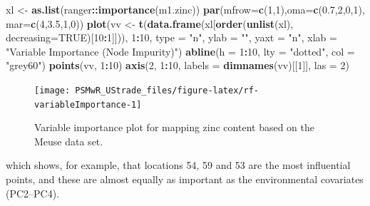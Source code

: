 \documentclass[graybox,natbib,nospthms,UStrade]{svmono}
\newenvironment{Shaded}{\begin{snugshade}}{\end{snugshade}}
\newcommand{\DataTypeTok}[1]{\textcolor[rgb]{0.27,0.27,0.27}{#1}}
\newcommand{\DecValTok}[1]{\textcolor[rgb]{0.06,0.06,0.06}{#1}}
\newcommand{\FloatTok}[1]{\textcolor[rgb]{0.06,0.06,0.06}{#1}}
\newcommand{\KeywordTok}[1]{\textcolor[rgb]{0.27,0.27,0.27}{\textbf{#1}}}
\newcommand{\NormalTok}[1]{#1}
\newcommand{\OperatorTok}[1]{\textcolor[rgb]{0.43,0.43,0.43}{\textbf{#1}}}
\newcommand{\OtherTok}[1]{\textcolor[rgb]{0.37,0.37,0.37}{#1}}
\newcommand{\StringTok}[1]{\textcolor[rgb]{0.5,0.5,0.5}{#1}}
\begin{document}
\begin{Shaded}
\begin{Highlighting}[]
\NormalTok{xl <-}\StringTok{ }\KeywordTok{as.list}\NormalTok{(ranger}\OperatorTok{::}\KeywordTok{importance}\NormalTok{(m1.zinc))}
\KeywordTok{par}\NormalTok{(}\DataTypeTok{mfrow=}\KeywordTok{c}\NormalTok{(}\DecValTok{1}\NormalTok{,}\DecValTok{1}\NormalTok{),}\DataTypeTok{oma=}\KeywordTok{c}\NormalTok{(}\FloatTok{0.7}\NormalTok{,}\DecValTok{2}\NormalTok{,}\DecValTok{0}\NormalTok{,}\DecValTok{1}\NormalTok{), }\DataTypeTok{mar=}\KeywordTok{c}\NormalTok{(}\DecValTok{4}\NormalTok{,}\FloatTok{3.5}\NormalTok{,}\DecValTok{1}\NormalTok{,}\DecValTok{0}\NormalTok{))}
\KeywordTok{plot}\NormalTok{(vv <-}\StringTok{ }\KeywordTok{t}\NormalTok{(}\KeywordTok{data.frame}\NormalTok{(xl[}\KeywordTok{order}\NormalTok{(}\KeywordTok{unlist}\NormalTok{(xl), }\DataTypeTok{decreasing=}\OtherTok{TRUE}\NormalTok{)[}\DecValTok{10}\OperatorTok{:}\DecValTok{1}\NormalTok{]])), }\DecValTok{1}\OperatorTok{:}\DecValTok{10}\NormalTok{, }
     \DataTypeTok{type =} \StringTok{"n"}\NormalTok{, }\DataTypeTok{ylab =} \StringTok{""}\NormalTok{, }\DataTypeTok{yaxt =} \StringTok{"n"}\NormalTok{, }\DataTypeTok{xlab =} \StringTok{"Variable Importance (Node Impurity)"}\NormalTok{)}
\KeywordTok{abline}\NormalTok{(}\DataTypeTok{h =} \DecValTok{1}\OperatorTok{:}\DecValTok{10}\NormalTok{, }\DataTypeTok{lty =} \StringTok{"dotted"}\NormalTok{, }\DataTypeTok{col =} \StringTok{"grey60"}\NormalTok{)}
\KeywordTok{points}\NormalTok{(vv, }\DecValTok{1}\OperatorTok{:}\DecValTok{10}\NormalTok{)}
\KeywordTok{axis}\NormalTok{(}\DecValTok{2}\NormalTok{, }\DecValTok{1}\OperatorTok{:}\DecValTok{10}\NormalTok{, }\DataTypeTok{labels =} \KeywordTok{dimnames}\NormalTok{(vv)[[}\DecValTok{1}\NormalTok{]], }\DataTypeTok{las =} \DecValTok{2}\NormalTok{)}
\end{Highlighting}
\end{Shaded}

\begin{figure}[H]

{\centering \texttt{[image: PSMwR\_UStrade\_files/figure-latex/rf-variableImportance-1]} 

}

\caption{Variable importance plot for mapping zinc content based on the Meuse data set.}\label{fig:rf-variableImportance}
\end{figure}

which shows, for example, that locations 54, 59 and 53 are the most influential points,
and these are almost equally as important as the environmental covariates (PC2--PC4).
\end{document}
